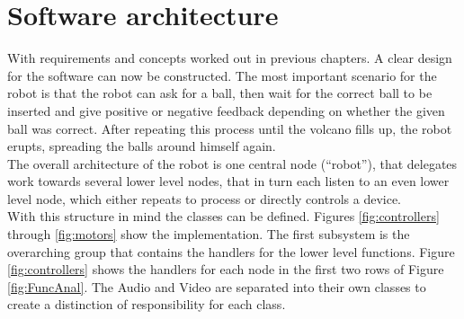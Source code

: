 \documentclass[11pt,twoside,a4paper]{report}
\begin{document}
\section{Software architecture}
With requirements and concepts worked out in previous chapters. A clear design for the software can now be constructed. 
The most important scenario for the robot is that the robot can ask for a ball, then wait for the correct ball to be inserted and give positive or negative feedback depending on whether the given ball was correct. After repeating this process until the volcano fills up, the robot erupts, spreading the balls around himself again. \\
The overall architecture of the robot is one central node (“robot”), that delegates work towards several lower level nodes, that in turn each listen to an even lower level node, which either repeats to process or directly controls a device. \\
With this structure in mind the classes can be defined. Figures \ref{fig:controllers} through \ref{fig:motors} show the implementation. The first subsystem is the overarching group that contains the handlers for the lower level functions. Figure \ref{fig:controllers} shows the handlers for each node in the first two rows of Figure \ref{fig:FuncAnal}. The Audio and Video are separated into their own classes to create a distinction of responsibility for each class. 
\end{document}
